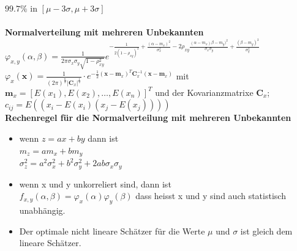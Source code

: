 		$99.7\% $ in $[ \mu - 3\sigma, \mu + 3\sigma]$\\\\
		\textbf{ Normalverteilung mit mehreren Unbekannten}\\
		$\varphi_{x,y}(\alpha,\beta)=\frac{1}{2\pi \sigma_x \sigma_y \sqrt{1-\rho_{xy}^2}}
			e^{-\frac{1}{2(1-\rho_{xy})^2} + \frac{(\alpha - m_x)^2}{\sigma_x^2} 
			- 2\rho_{xy}\frac{(\alpha - m_x)\beta - m_y)^2}{\sigma_x \sigma_y} + \frac{(\beta - m_y)^2}{\sigma_y^2}}$\\
			$\varphi_x(\textbf{x})=\frac{1}{(2\pi)^{\frac{n}{2}}|\textbf{C}_x|^{\frac{1}{2}}}\cdot 
			e^{-\frac{1}{2}(\textbf{x} - \textbf{m}_x)^T \textbf{C}_x^{-1} (\textbf{x} - \textbf{m}_x)}$ mit \\
			$\textbf{m}_x=[E(x_1), E(x_2), \ldots, E(x_n)]^T$ und der Kovarianzmatrixe $\textbf{C}_x$; $c_{ij} = E((x_i-E(x_i)(x_j-E(x_j))))$ \\
		\textbf{Rechenregel für die Normalverteilung mit mehreren Unbekannten}
		\begin{itemize}
		  \item wenn $z=a x + b y$ dann ist \\
		  $m_z =  a m_x + b m_y$\\
		  $\sigma_z^2 = a^2\sigma_x^2 + b^2\sigma_y^2+2ab\sigma_x\sigma_y$
		  \item wenn x und y unkorreliert sind, dann ist \\
		  		$f_{x,y}(\alpha, \beta) = \varphi_x(\alpha)\varphi_y(\beta)$ dass heisst x und y sind auch statistisch unabhängig.
		  \item Der optimale nicht lineare Schätzer für die Werte $\mu$ und $\sigma$ ist gleich dem lineare Schätzer.
		\end{itemize}
   		
 
        
        
        
